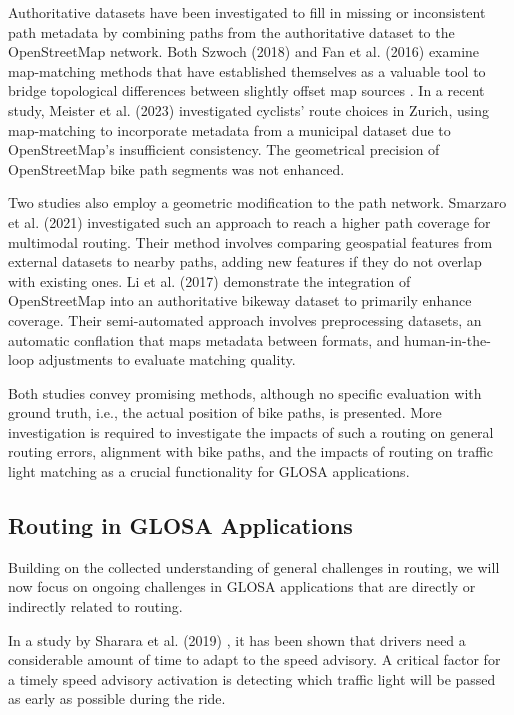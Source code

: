 Authoritative datasets have been investigated to fill in missing or inconsistent path metadata by combining paths from the authoritative dataset to the OpenStreetMap network. Both Szwoch (2018) \cite{szwoch_combining_2019} and Fan et al. (2016) \cite{fan_polygon-based_2016} examine map-matching methods that have established themselves as a valuable tool to bridge topological differences between slightly offset map sources \cite{chao_survey_2020}. In a recent study, Meister et al. (2023) \cite{meister_route_2023} investigated cyclists' route choices in Zurich, using map-matching to incorporate metadata from a municipal dataset due to OpenStreetMap's insufficient consistency. The geometrical precision of OpenStreetMap bike path segments was not enhanced.

Two studies also employ a geometric modification to the path network. Smarzaro et al. (2021) \cite{smarzaro_creation_2021} investigated such an approach to reach a higher path coverage for multimodal routing. Their method involves comparing geospatial features from external datasets to nearby paths, adding new features if they do not overlap with existing ones. Li et al. (2017) \cite{li_optimized_2017} demonstrate the integration of OpenStreetMap into an authoritative bikeway dataset to primarily enhance coverage. Their semi-automated approach involves preprocessing datasets, an automatic conflation that maps metadata between formats, and human-in-the-loop adjustments to evaluate matching quality. 

Both studies convey promising methods, although no specific evaluation with ground truth, i.e., the actual position of bike paths, is presented. More investigation is required to investigate the impacts of such a routing on general routing errors, alignment with bike paths, and the impacts of routing on traffic light matching as a crucial functionality for GLOSA applications.

\subsection{Routing in GLOSA Applications}

Building on the collected understanding of general challenges in routing, we will now focus on ongoing challenges in GLOSA applications that are directly or indirectly related to routing.

In a study by Sharara et al. (2019) \cite{sharara_impact_2019}, it has been shown that drivers need a considerable amount of time to adapt to the speed advisory. A critical factor for a timely speed advisory activation is detecting which traffic light will be passed as early as possible during the ride. 

